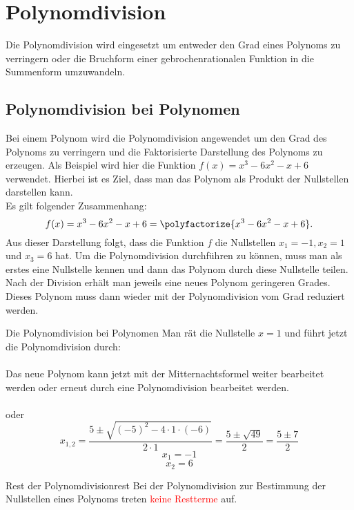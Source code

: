 \section{Polynomdivision}
Die Polynomdivision wird eingesetzt um entweder den Grad eines Polynoms zu verringern oder die Bruchform einer gebrochenrationalen Funktion in die Summenform umzuwandeln.
\subsection{Polynomdivision bei Polynomen}\label{polynomdivision}

    Bei einem Polynom wird die Polynomdivision angewendet um den Grad des Polynoms zu verringern und die Faktorisierte Darstellung des Polynoms zu erzeugen. Als Beispiel wird hier die Funktion $f(x) = x^3-6x^2-x+6$ verwendet. Hierbei ist es Ziel, dass man das Polynom als Produkt der Nullstellen darstellen kann.\\
    Es gilt folgender Zusammenhang: $$f(x) = x^3-6x^2-x+6 =  \polyfactorize{x^3-6x^2-x+6}.$$ Aus dieser Darstellung folgt, dass die Funktion $f$ die Nullstellen $x_1 = -1, x_2 = 1$ und $x_3= 6$ hat. Um die Polynomdivision durchführen zu können, muss man als erstes eine Nullstelle kennen und dann das Polynom durch diese Nullstelle teilen. Nach der Division erhält man jeweils eine neues Polynom geringeren Grades. Dieses Polynom muss dann wieder mit der Polynomdivision vom Grad reduziert werden.
    \begin{bsp}{Die Polynomdivision bei Polynomen}{} 
Man rät die Nullstelle $x=1$ und führt jetzt die Polynomdivision durch:\\
 \\
 Das neue Polynom kann jetzt mit der Mitternachtsformel weiter bearbeitet werden oder erneut durch eine Polynomdivision bearbeitet werden. \\
  \\
  oder
  $$ x_{1,2} = \dfrac{5\pm \sqrt{(-5)^2 - 4\cdot 1 \cdot (-6)}}{2\cdot 1} = \dfrac{5 \pm \sqrt{49} }{2} = \dfrac{5\pm 7}{2}$$
 $$ x_1 = -1$$
 $$ x_2= 6$$
\begin{center}
\end{center}
\end{bsp}
\begin{b8d}{Rest der Polynomdivision}{rest}
  Bei der Polynomdivision zur Bestimmung der Nullstellen eines Polynoms treten \textcolor{red}{keine Restterme} auf.   
\end{b8d}

